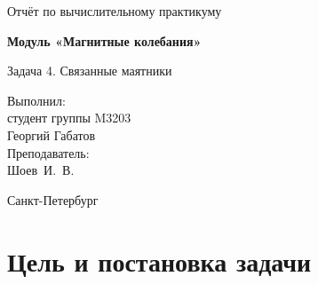 \documentclass[12pt,a4paper]{article}
\begin{document}
\begin{titlepage}
  \centering
  \vspace*{1.5cm}

  {\Large Отчёт по вычислительному практикуму\par}
  \vspace{2.5cm}

  {\LARGE\bfseries Модуль «Магнитные колебания»\par}
  \vspace{1cm}

  {\Large Задача 4. Связанные маятники\par}

  \vfill

  \begin{flushright}
    \begin{minipage}{0.55\textwidth}
      \raggedleft
      Выполнил:\\
      студент группы M3203\\
      Георгий Габатов\\[12pt]
      Преподаватель:\\
      Шоев~И.~В.
    \end{minipage}
  \end{flushright}

  \vspace{2cm}

  {\large Санкт-Петербург\\[6pt]
  \the\year\par}

\end{titlepage}

\begin{abstract}
\noindent
В работе построена компьютерная модель двух связанных математических маятников
с вязким затуханием. Выведены уравнения движения при малых углах, найдены
нормальные частоты, реализовано численное интегрирование методом Рунге-Кутты
4-го порядка. Интерактивное демо позволяет изменять параметры модели и
наблюдать биения, затухание и влияние жёсткости пружины. Численные результаты
согласованы с аналитическими формулами и спектральным анализом (погрешность
определения частот менее 2\%).
\end{abstract}

\tableofcontents
\newpage

\section{Цель и постановка задачи}
\end{document}
